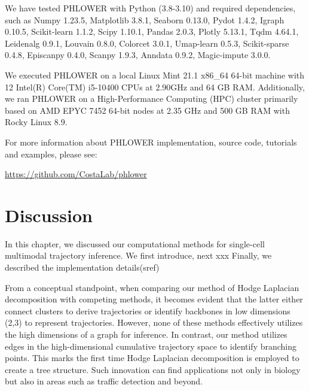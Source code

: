 We have tested PHLOWER with Python (3.8-3.10) and required dependencies, such as Numpy 1.23.5, Matplotlib 3.8.1, Seaborn 0.13.0, Pydot 1.4.2, Igraph 0.10.5, Scikit-learn 1.1.2, Scipy 1.10.1, Pandas 2.0.3, Plotly 5.13.1, Tqdm 4.64.1, Leidenalg 0.9.1, Louvain 0.8.0, Colorcet 3.0.1, Umap-learn 0.5.3, Scikit-sparse 0.4.8, Episcanpy 0.4.0, Scanpy 1.9.3, Anndata 0.9.2, Magic-impute 3.0.0.

We executed PHLOWER on a local Linux Mint 21.1 x86\_64 64-bit machine with 12 Intel(R) Core(TM) i5-10400 CPUs at 2.90GHz and 64 GB RAM. Additionally, we ran PHLOWER on a High-Performance Computing (HPC) cluster primarily based on AMD EPYC 7452 64-bit nodes at 2.35 GHz and 500 GB RAM with Rocky Linux 8.9.

For more information about PHLOWER implementation, source code, tutorials and examples, please see:
\begin{center}
\url{https://github.com/CostaLab/phlower}
\end{center}

\section{Discussion}
\label{TI_methods:discussion}
In this chapter, we discussed our computational methods for single-cell multimodal trajectory inference. We first introduce, next xxx
Finally, we described the implementation details(sref{})

From a conceptual standpoint, when comparing our method of Hodge Laplacian decomposition with competing methods, it becomes evident that the latter either connect clusters to derive trajectories or identify backbones in low dimensions (2,3) to represent trajectories. However, none of these methods effectively utilizes the high dimensions of a graph for inference. In contrast, our method utilizes edges in the high-dimensional cumulative trajectory space to identify branching points. This marks the first time Hodge Laplacian decomposition is employed to create a tree structure. Such innovation can find applications not only in biology but also in areas such as traffic detection and beyond.

